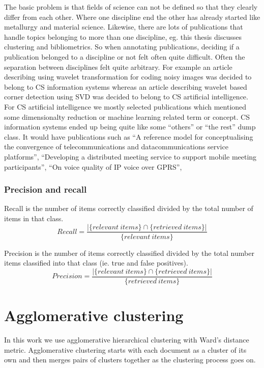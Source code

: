 The basic problem is that fields of science can not be 
defined so that they clearly differ from each other. Where one 
discipline end the other has already started like metallurgy and 
material science. Likewise, there are lots of publications that 
handle topics belonging to more than one discipline, eg. this 
thesis discusses clustering and bibliometrics. So when annotating 
publications, deciding if a publication belonged to
a discipline or not felt often quite difficult. Often the 
separation between disciplines felt quite arbitrary. For example
an article describing using wavelet transformation for coding noisy
images was decided to belong to CS information systems whereas an
article describing wavelet based corner detection using SVD was
decided to belong to CS artificial intelligence.
For CS artificial intelligence we mostly selected publications 
which mentioned some dimensionalty reduction or machine learning 
related term or concept. CS information systems ended up being 
quite like some ``others'' or
``the rest'' dump class. It would have publications such as
``A reference model for conceptualising the convergence of 
telecommunications and datacommunications service platforms'',
``Developing a distributed meeting service to support mobile 
meeting participants'',
``On voice quality of IP voice over GPRS'',

\subsubsection{Precision and recall}
Recall is the number of items correctly classified divided by the 
total number of items in that class.
\begin{equation}
 Recall = \frac{|\{relevant\ items\} \cap \{retrieved\ items\}|} 
{\{relevant\ items\}}
\end{equation}

Precision is the number of items correctly classified divided by 
the total number items classified into that class (ie. true and 
false positives).
\begin{equation}
 Precision = \frac{|\{relevant\ items\} \cap \{retrieved\ 
items\}|} 
{\{retrieved\ items\}}
\end{equation}


\section{Agglomerative clustering}
\label{sec:agglomerativeclustering}
In this work we use agglomerative hierarchical clustering with 
Ward's distance metric.\cite{ref_here}  Agglomerative clustering starts with each document 
as a cluster of its own and then merges pairs of clusters together 
as the clustering process goes on.


